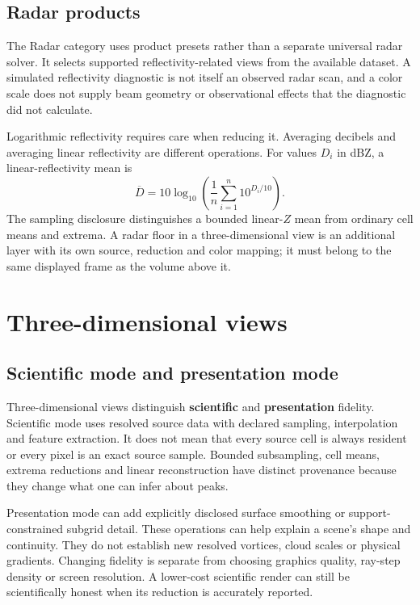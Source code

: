 \subsection{Radar products}
The Radar category uses product presets rather than a separate universal radar
solver. It selects supported reflectivity-related views from the available
dataset. A simulated reflectivity diagnostic is not itself an observed radar
scan, and a color scale does not supply beam geometry or observational effects
that the diagnostic did not calculate.

Logarithmic reflectivity requires care when reducing it. Averaging decibels and
averaging linear reflectivity are different operations. For values $D_i$ in dBZ,
a linear-reflectivity mean is
\begin{equation}
 \overline D=10\log_{10}\!\left(\frac{1}{n}
       \sum_{i=1}^{n}10^{D_i/10}\right).
\end{equation}
The sampling disclosure distinguishes a bounded linear-$Z$ mean from ordinary
cell means and extrema. A radar floor in a three-dimensional view is an
additional layer with its own source, reduction and color mapping; it must
belong to the same displayed frame as the volume above it.

\section{Three-dimensional views}
\subsection{Scientific mode and presentation mode}
Three-dimensional views distinguish \textbf{scientific} and
\textbf{presentation} fidelity. Scientific mode uses resolved source data with
declared sampling, interpolation and feature extraction. It does not mean that
every source cell is always resident or every pixel is an exact source sample.
Bounded subsampling, cell means, extrema reductions and linear reconstruction
have distinct provenance because they change what one can infer about peaks.

Presentation mode can add explicitly disclosed surface smoothing or
support-constrained subgrid detail. These operations can help explain a scene's
shape and continuity. They do not establish new resolved vortices, cloud scales
or physical gradients. Changing fidelity is separate from choosing graphics
quality, ray-step density or screen resolution. A lower-cost scientific render
can still be scientifically honest when its reduction is accurately reported.

